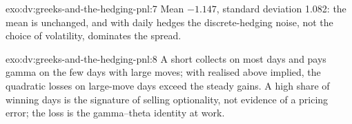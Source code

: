 \begin{solution}{exo:dv:greeks-and-the-hedging-pnl:7}
Mean $-1.147$, standard deviation 1.082: the mean is unchanged, and with daily hedges
the discrete-hedging noise, not the choice of volatility, dominates the spread.
\end{solution}

\begin{solution}{exo:dv:greeks-and-the-hedging-pnl:8}
A short  collects  on most days and pays gamma on the few days with large
moves; with realised above implied, the quadratic losses on large-move days exceed the
steady gains. A high share of winning days is the signature of selling
optionality, not evidence of a pricing error; the loss is the gamma--theta identity at
work.
\end{solution}

